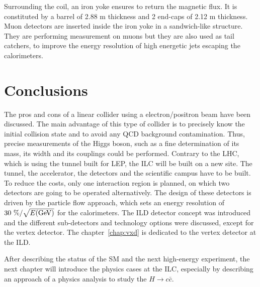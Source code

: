      Surrounding the coil, an iron yoke ensures to return the magnetic flux. 
     It is constituted by a barrel of 2.88 m thickness and 2 end-caps of 2.12 m thickness.
     Muon detectors are inserted inside the iron yoke in a sandwich-like structure.
     They are performing measurement on muons but they are also used as tail catchers, to improve the energy resolution of high energetic jets escaping the calorimeters. 


   \section{Conclusions}

   The pros and cons of a linear collider using a electron/positron beam have been discussed. 
   The main advantage of this type of collider is to precisely know the initial collision state and to avoid any \gls{QCD} background contamination.
   Thus, precise measurements of the Higgs boson, such as a fine determination of its mass, its width and its couplings could be performed.
   Contrary to the \gls{LHC}, which is using the tunnel built for \gls{LEP}, the \gls{ILC} will be built on a new site.
   The tunnel, the accelerator, the detectors and the scientific campus have to be built. 
   To reduce the costs, only one interaction region is planned, on which two detectors are going to be operated alternatively.
   The design of these detectors is driven by the particle flow approach, which sets an energy resolution of $30~\%/\sqrt{E\rm{(GeV)}}$ for the calorimeters.
   The \gls{ILD} detector concept was introduced and the different sub-detectors and technology options were discussed, except for the vertex detector.
   The chapter~\ref{chap:vxd} is dedicated to the vertex detector at the \gls{ILD}.
   
   After describing the status of the \gls{SM} and the next high-energy experiment, the next chapter will introduce the physics cases at the \gls{ILC}, especially by describing an approach of a physics analysis to study the $H \rightarrow c\bar{c}$.

